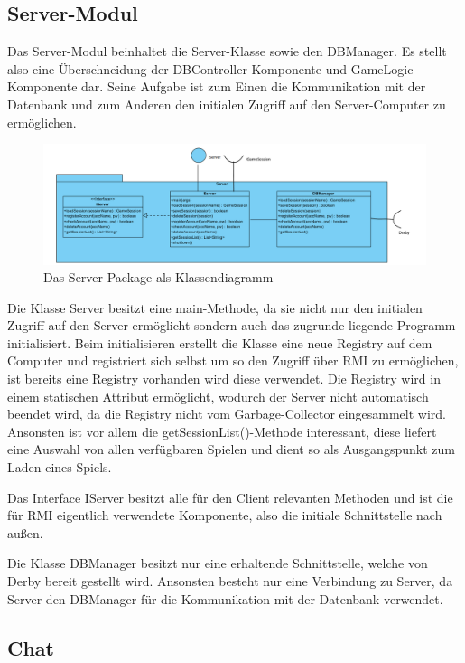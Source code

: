 \documentclass[fontsize=12pt,paper=a4,twoside]{scrartcl}
\begin{document}
\subsection{Server-Modul}

Das Server-Modul beinhaltet die Server-Klasse sowie den DBManager. Es stellt also eine Überschneidung der DBController-Komponente und GameLogic-Komponente dar. Seine Aufgabe ist zum Einen die Kommunikation mit der Datenbank und zum Anderen den initialen Zugriff auf den Server-Computer zu ermöglichen.

\begin{figure}[h]
\centering
\includegraphics[width=1.0\linewidth]{ServerClass}
\caption{Das Server-Package als Klassendiagramm}
\label{fig:ServerClass}
\end{figure}

Die Klasse Server besitzt eine main-Methode, da sie nicht nur den initialen Zugriff auf den Server ermöglicht sondern auch das zugrunde liegende Programm initialisiert. Beim initialisieren erstellt die Klasse eine neue Registry auf dem Computer und registriert sich selbst um so den Zugriff über RMI zu ermöglichen, ist bereits eine Registry vorhanden wird diese verwendet. Die Registry wird in einem statischen Attribut ermöglicht, wodurch der Server nicht automatisch beendet wird, da die Registry nicht vom Garbage-Collector eingesammelt wird. Ansonsten ist vor allem die getSessionList()-Methode interessant, diese liefert eine Auswahl von allen verfügbaren Spielen und dient so als Ausgangspunkt zum Laden eines Spiels.

Das Interface IServer besitzt alle für den Client relevanten Methoden und ist die für RMI eigentlich verwendete Komponente, also die initiale Schnittstelle nach außen.

Die Klasse DBManager besitzt nur eine erhaltende Schnittstelle, welche von Derby bereit gestellt wird. Ansonsten besteht nur eine Verbindung zu Server, da Server den DBManager für die Kommunikation mit der Datenbank verwendet.

\subsection{Chat}
\end{document}
